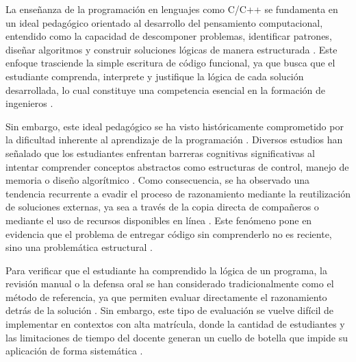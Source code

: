 La enseñanza de la programación en lenguajes como C/C++ se fundamenta en un ideal pedagógico orientado al desarrollo del pensamiento computacional, entendido como la capacidad de descomponer problemas, identificar patrones, diseñar algoritmos y construir soluciones lógicas de manera estructurada \cite{WeberWulff2023Testing}. Este enfoque trasciende la simple escritura de código funcional, ya que busca que el estudiante comprenda, interprete y justifique la lógica de cada solución desarrollada, lo cual constituye una competencia esencial en la formación de ingenieros \cite{WeberWulff2023Testing}.

Sin embargo, este ideal pedagógico se ha visto históricamente comprometido por la dificultad inherente al aprendizaje de la programación \cite{Guo2021GraphCodeBERT}. Diversos estudios han señalado que los estudiantes enfrentan barreras cognitivas significativas al intentar comprender conceptos abstractos como estructuras de control, manejo de memoria o diseño algorítmico \cite{Guo2021GraphCodeBERT}. Como consecuencia, se ha observado una tendencia recurrente a evadir el proceso de razonamiento mediante la reutilización de soluciones externas, ya sea a través de la copia directa de compañeros o mediante el uso de recursos disponibles en línea \cite{Guo2021GraphCodeBERT}. Este fenómeno pone en evidencia que el problema de entregar código sin comprenderlo no es reciente, sino una problemática estructural \cite{Guo2021GraphCodeBERT}.

Para verificar que el estudiante ha comprendido la lógica de un programa, la revisión manual o la defensa oral se han considerado tradicionalmente como el método de referencia, ya que permiten evaluar directamente el razonamiento detrás de la solución \cite{MartinezGil2026Improving}. Sin embargo, este tipo de evaluación se vuelve difícil de implementar en contextos con alta matrícula, donde la cantidad de estudiantes y las limitaciones de tiempo del docente generan un cuello de botella que impide su aplicación de forma sistemática \cite{MartinezGil2026Improving}.


